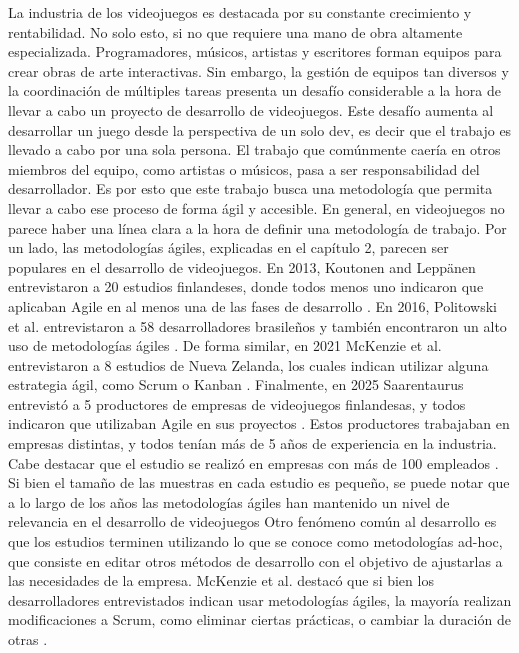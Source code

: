 La industria de los videojuegos es destacada por su constante crecimiento y rentabilidad. No solo esto, si no que requiere una mano de obra altamente especializada. Programadores, músicos, artistas y escritores forman equipos para crear obras de arte interactivas. Sin embargo, la gestión de equipos tan diversos y la coordinación de múltiples tareas presenta un desafío considerable a la hora de llevar a cabo un proyecto de desarrollo de videojuegos.
\bigbreak
Este desafío aumenta al desarrollar un juego desde la perspectiva de un solo dev, es decir que el trabajo es llevado a cabo por una sola persona. El trabajo que comúnmente caería en otros miembros del equipo, como artistas o músicos, pasa a ser responsabilidad del desarrollador. Es por esto que este trabajo busca una metodología que permita llevar a cabo ese proceso de forma ágil y accesible.
\bigbreak
En general, en videojuegos no parece haber una línea clara a la hora de definir una metodología de trabajo. Por un lado, las metodologías ágiles, explicadas en el capítulo 2, parecen ser populares en el desarrollo de videojuegos. En 2013, Koutonen and Leppänen entrevistaron a 20 estudios finlandeses, donde todos menos uno indicaron que aplicaban Agile en al menos una de las fases de desarrollo \cite{koutonenHowAreAgile2013}.
En 2016, Politowski et al. entrevistaron a 58 desarrolladores brasileños y también encontraron un alto uso de metodologías ágiles \cite{politowskiSoftwareEngineeringProcesses2016}.
De forma similar, en 2021 McKenzie et al. entrevistaron a 8 estudios de Nueva Zelanda, los cuales indican utilizar alguna estrategia ágil, como Scrum o Kanban \cite{mckenzieAgileNotAgile2021}.
Finalmente, en 2025 Saarentaurus entrevistó a 5 productores de empresas de videojuegos finlandesas, y todos indicaron que utilizaban Agile en sus proyectos \cite{saarentausAgileScrumMethods2025}.
Estos productores trabajaban en empresas distintas, y todos tenían más de 5 años de experiencia en la industria. Cabe destacar que el estudio se realizó en empresas con más de 100 empleados \cite{saarentausAgileScrumMethods2025}.
\break
Si bien el tamaño de las muestras en cada estudio es pequeño, se puede notar que a lo largo de los años las metodologías ágiles han mantenido un nivel de relevancia en el desarrollo de videojuegos
\bigbreak
Otro fenómeno común al desarrollo es que los estudios terminen utilizando lo que se conoce como metodologías ad-hoc, que consiste en editar otros métodos de desarrollo con el objetivo de ajustarlas a las necesidades de la empresa. McKenzie et al. destacó que si bien los desarrolladores entrevistados indican usar metodologías ágiles, la mayoría realizan modificaciones a Scrum, como eliminar ciertas prácticas, o cambiar la duración de otras \cite{mckenzieAgileNotAgile2021}.
